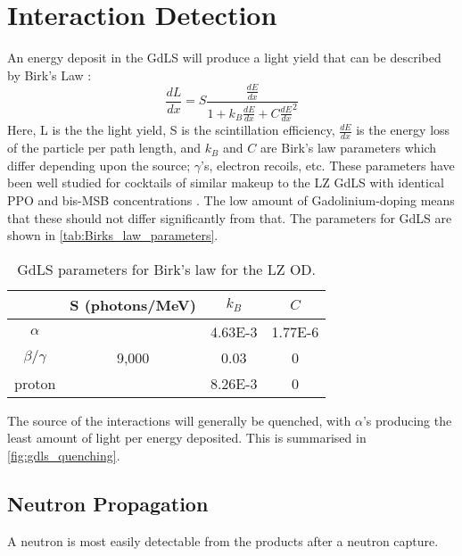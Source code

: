 \section{Interaction Detection}
\label{sec:od_physics}
\par
An energy deposit in the GdLS will produce a light yield that can be described by Birk's Law \cite{birks_law_ref}:
\begin{equation} 
    \frac{dL}{dx} = S \frac{\frac{dE}{dx}}{1 + k_{B}\frac{dE}{dx} + C\frac{dE}{dx}^2}
    \label{eq:birkslaw}
\end{equation}
Here, L is the the light yield, S is the scintillation efficiency, $\frac{dE}{dx}$ is the energy loss of the particle per path length, and $k_{B}$ and $C$ are Birk's law parameters which differ depending upon the source; $\gamma$'s, electron recoils, etc.
These parameters have been well studied for cocktails of similar makeup to the LZ GdLS with identical PPO and bis-MSB concentrations \cite{ls_alpha_quenching_ref,ls_proton_quenching_ref}.
The low amount of Gadolinium-doping means that these should not differ significantly from that.
The parameters for GdLS are shown in \autoref{tab:Birks_law_parameters}.
\begin{table}[!htbp]
    \centering
    \begin{tabular}{c | c | c | c }
                   & S (photons/MeV) & $k_{B}$ & $C$ \\ \hline
    $\alpha$       &                 & 4.63E-3 & 1.77E-6 \\
    $\beta/\gamma$ & 9,000           & 0.03    & 0 \\ 
    proton         &                 & 8.26E-3 & 0
    \end{tabular}
    \caption{GdLS parameters for Birk's law for the LZ OD.}
    \label{tab:Birks_law_parameters}
\end{table} 

\par
The source of the interactions will generally be quenched, with $\alpha$'s producing the least amount of light per energy deposited.
This is summarised in \autoref{fig:gdls_quenching}.



\subsection{Neutron Propagation}
\par
A neutron is most easily detectable from the products after a neutron capture.



